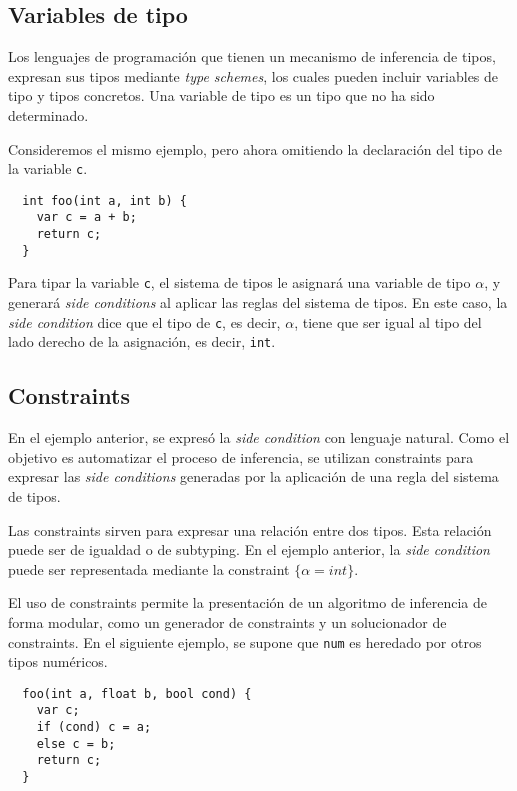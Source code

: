 \subsection{Variables de tipo} \label{schemes}
Los lenguajes de programación que tienen un mecanismo de inferencia de tipos, expresan sus tipos mediante \textit{type schemes}, los cuales pueden incluir variables de tipo y tipos concretos. Una variable de tipo es un tipo que no ha sido determinado.

Consideremos el mismo ejemplo, pero ahora omitiendo la declaración del tipo de la variable \texttt{c}.

\begin{lstlisting}
  int foo(int a, int b) {
    var c = a + b;
    return c;
  }
\end{lstlisting}

Para tipar la variable \texttt{c}, el sistema de tipos le asignará una variable de tipo $\alpha$, y generará \textit{side conditions} al aplicar las reglas del sistema de tipos. En este caso, la \textit{side condition} dice que el tipo de \texttt{c}, es decir, $\alpha$, tiene que ser igual al tipo del lado derecho de la asignación, es decir, \texttt{int}.

\subsection{Constraints} \label{constraints}
En el ejemplo anterior, se expresó la \textit{side condition} con lenguaje natural. Como el objetivo es automatizar el proceso de inferencia, se utilizan constraints para expresar las \textit{side conditions} generadas por la aplicación de una regla del sistema de tipos.

Las constraints sirven para expresar una relación entre dos tipos. Esta relación puede ser de igualdad o de subtyping. En el ejemplo anterior, la \textit{side condition} puede ser representada mediante la constraint $\{\alpha = int\}$.

El uso de constraints permite la presentación de un algoritmo de inferencia de forma modular, como un generador de constraints y un solucionador de constraints. En el siguiente ejemplo, se supone que \texttt{num} es heredado por otros tipos numéricos.

\begin{lstlisting}
  foo(int a, float b, bool cond) {
    var c;
    if (cond) c = a;
    else c = b;
    return c;
  }
\end{lstlisting}

